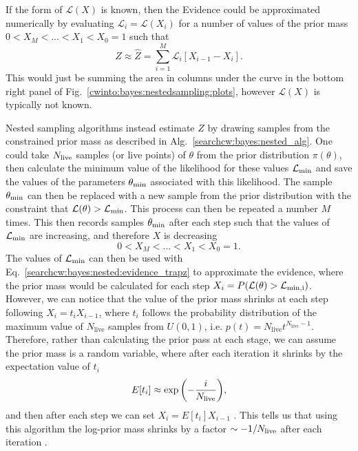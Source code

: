 If the form of $\mathcal{L}(X)$ is known, then the Evidence could be approximated numerically by evaluating $\mathcal{L}_i = \mathcal{L}(X_i)$ for a number of values of the prior mass $0 < X_M < ... < X_1 < X_0 = 1$ such that
\begin{equation}
\label{searchcw:bayes:nested:evidence_trapz}
Z \approx \hat{Z} = \sum_{i=1}^{M} \mathcal{L}_i \left[  X_{i-1} - X_{i}\right].
\end{equation} 
This would just be summing the area in columns under the curve in the bottom right panel of Fig.~\ref{cwinto:bayes:nestedsampling:plots}, however $\mathcal{L}(X)$  is typically not known.

Nested sampling algorithms instead estimate $Z$ by drawing samples from the constrained prior mass as described in Alg.~\ref{searchcw:bayes:nested_alg}.
One could take $N_{\rm{live}}$ samples (or live points) of $\theta$ from the prior distribution $\pi(\theta)$, then calculate the minimum value of the likelihood for these values $\mathcal{L}_{\rm{min}}$ and save the values of the parameters $\theta_{\rm{min}}$ associated with this likelihood.
The sample $\theta_{\rm{min}}$ can then be replaced with a new sample from the prior distribution with the constraint that $\mathcal{L}(\theta) > \mathcal{L}_{\rm{min}}$. This process can then be repeated a number $M$ times.
This then records samples $\theta_{\rm{min}}$ after each step such that the values of $\mathcal{L}_{\rm{min}}$ are increasing, and therefore $X$ is decreasing
\begin{equation}
	0 < X_M < ... < X_1 < X_0 = 1.
\end{equation}
The values of $\mathcal{L}_{\rm{min}}$ can then be used with Eq.~\ref{searchcw:bayes:nested:evidence_trapz} to approximate the evidence, where the prior mass would be calculated for each step $X_i = P(\mathcal{L}(\theta) > \mathcal{L}_{\rm{min},i})$.
However, we can notice that the value of the prior mass shrinks at each step following $X_i = t_i X_{i-1}$, where $t_i$ follows the probability distribution of the maximum value of $N_{\text{live}}$ samples from $U(0,1)$, i.e. $p(t) = N_{\text{live}} t^{N_{\text{live}} - 1}$.
Therefore, rather than calculating the prior pass at each stage, we can assume the prior mass is a random variable, where after each iteration it shrinks by the expectation value of $t_i$
\begin{equation}
E[t_i] \approx \exp{\left(-\frac{i}{N_{\rm{live}}}\right)},
\end{equation}
%
and then after each step we can set $X_i = E[t_i] X_{i-1}$ \citep{feroz2019ImportanceNested}.
This tells us that using this algorithm the log-prior mass shrinks by a factor $\sim -1/N_{\rm{live}}$ after each iteration \citep{speagle2019DynestyDynamic}. 

